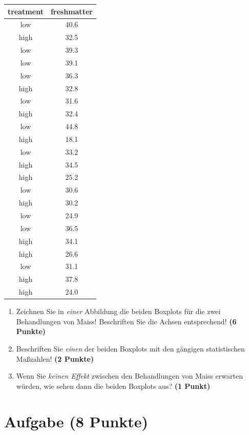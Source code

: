 \documentclass[a4paper, 9pt]{scrartcl}\usepackage[]{graphicx}\usepackage[]{xcolor}
\begin{document}
\begin{table}[!h]
\centering
\begin{tabular}{cc}
\toprule
treatment & freshmatter\\
\midrule
low & 40.6\\
high & 32.5\\
low & 39.3\\
low & 39.1\\
low & 36.3\\
\addlinespace
high & 32.8\\
low & 31.6\\
high & 32.4\\
low & 44.8\\
high & 18.1\\
\addlinespace
low & 33.2\\
high & 34.5\\
high & 25.2\\
low & 30.6\\
high & 30.2\\
\addlinespace
low & 24.9\\
low & 36.5\\
high & 34.1\\
high & 26.6\\
low & 31.1\\
\addlinespace
high & 37.8\\
high & 24.0\\
\bottomrule
\end{tabular}
\end{table}



\begin{enumerate}
\item Zeichnen Sie in \textit{einer} Abbildung die beiden Boxplots f{\"u}r die
  zwei Behandlungen von Maiss! Beschriften Sie die Achsen entsprechend!
  \textbf{(6 Punkte)}
\item Beschriften Sie \textit{einen} der beiden Boxplots mit den g{\"a}ngigen
  statistischen Ma{\ss}zahlen! \textbf{(2 Punkte)}
\item Wenn Sie \textit{keinen Effekt} zwischen den Behandlungen von
  Maiss erwarten w{\"u}rden, wie sehen dann die beiden Boxplots aus?
  \textbf{(1 Punkt)}
\end{enumerate} 
\clearpage

\section{Aufgabe \hfill (8 Punkte)}
\end{document}
